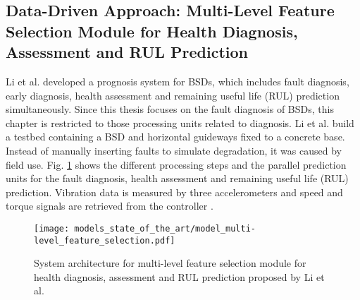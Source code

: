 \subsection{Data-Driven Approach: Multi-Level Feature Selection Module for Health Diagnosis, Assessment and RUL Prediction}
Li et al. \cite{LiPin2018} developed a prognosis system for BSDs, which includes fault diagnosis, early diagnosis, health assessment and remaining useful life (RUL) prediction simultaneously. Since this thesis focuses on the fault diagnosis of BSDs, this chapter is restricted to those processing units related to diagnosis. Li et al. build a testbed containing a BSD and horizontal guideways fixed to a concrete base. Instead of manually inserting faults to simulate degradation, it was caused by field use. Fig.  \ref{fig:level_feature_selection_model} shows the different processing steps and the parallel prediction units for the fault diagnosis, health assessment and remaining useful life (RUL) prediction. Vibration data is measured by three accelerometers and speed and torque signals are retrieved from the controller \cite{LiPin2018}. 

\begin{figure}[H]
  \centering
  \texttt{[image: models\_state\_of\_the\_art/model\_multi-level\_feature\_selection.pdf]}
  \caption{System architecture for multi-level feature selection module for health diagnosis, assessment and RUL prediction proposed by Li et al. \cite{LiPin2018}}
  \label{fig:level_feature_selection_model}
\end{figure}


